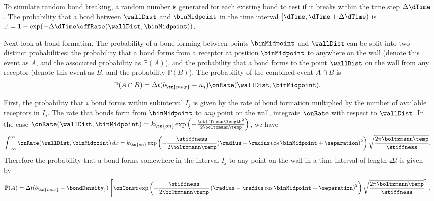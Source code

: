 To simulate random bond breaking, a random number is generated for
each existing bond to test if it breaks within the time step
$\Delta \dTime$. The probability that a bond between $\wallDist$ and
$\binMidpoint$ in the time interval $[\dTime, \dTime + \Delta \dTime)$
is $\mathbb{P} = 1 - \exp(-\Delta \dTime \offRate(\wallDist,
\binMidpoint))$.

Next look at bond formation. The probability of a bond forming between
points $\binMidpoint$ and $\wallDist$ can be split into two distinct
probabilities: the probability that a bond forms from a receptor at
position $\binMidpoint$ to anywhere on the wall (denote this event as
$A$, and the associated probability as $\mathbb{P}(A)$), and the
probability that a bond forms to the point $\wallDist$ on the wall
from any receptor (denote this event as $B$, and the probability
$\mathbb{P}(B)$). The probability of the combined event $A \cap B$ is
\begin{equation}
  \label{eq:joint-prob}
  \mathbb{P}(A \cap B) = \Delta t (b_\tn{max} - n_j)
  \onRate(\wallDist, \binMidpoint).
\end{equation}




First, the probability that a bond forms within subinterval $I_j$ is
given by the rate of bond formation multiplied by the number of
available receptors in $I_j$. The rate that bonds form from
$\binMidpoint$ to \emph{any} point on the wall, integrate $\onRate$
with respect to $\wallDist$. In the case $\onRate(\wallDist,
\binMidpoint) = k_\tn{on} \exp\left(-\frac{\stiffness
    \length^2}{2\boltzmann \temp}\right)$, we have
\begin{equation}
  \label{eq:total_fm_rate}
  \int_{-\infty}^{\infty} \onRate(\wallDist, \binMidpoint)\, dx = k_\tn{on} \exp
  \left( -\frac{\stiffness}{2\boltzmann \temp} (\radius - \radius
    \cos\binMidpoint + \separation)^2 \right) \sqrt{\frac{2 \pi
      \boltzmann \temp}{\stiffness}}.
\end{equation}
Therefore the probability that a bond forms somewhere in the interval
$I_j$ to any point on the wall in a time interval of length $\Delta t$
is given by 
\begin{equation}
  \label{eq:form-prob}
  \mathbb{P}(A) = \Delta t (b_\tn{max} - \bondDensity_j) \left[ \onConst
    \exp \left( - \frac{\stiffness}{2 \boltzmann \temp} \left( \radius
        - \radius\cos\binMidpoint + \separation \right)^2 \right)
    \sqrt{\frac{2\pi \boltzmann \temp}{\stiffness}} \right].
\end{equation}

